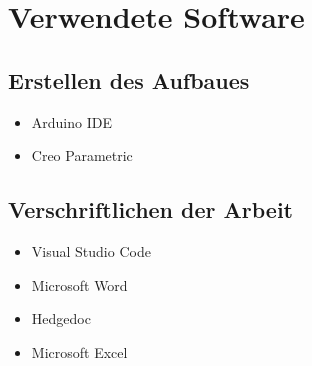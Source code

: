 \section{Verwendete Software}

\subsection{Erstellen des Aufbaues}

\begin{itemize}
    \item Arduino IDE 
    \item Creo Parametric 
\end{itemize}

\subsection{Verschriftlichen der Arbeit}

\begin{itemize}
    \item Visual Studio Code
    \item Microsoft Word
    \item Hedgedoc
    \item Microsoft Excel
\end{itemize}